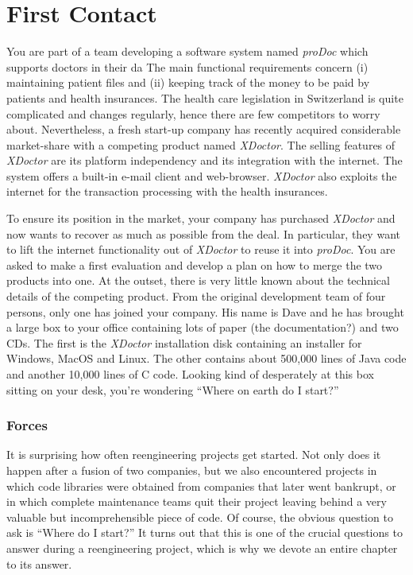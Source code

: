 \documentclass[a4paper,10pt,twoside]{book}
\begin{document}
	\renewcommand{\nnbb}[2]{} %
	\sloppy
\fi
\chapter{First Contact}

You are part of a team developing a software system named \emph{proDoc} which supports doctors in their da	 The main functional requirements concern (i) maintaining patient files and (ii) keeping track of the money to be paid by patients and health insurances. The health care legislation in Switzerland is quite complicated and changes regularly, hence there are few competitors to worry about. Nevertheless, a fresh start-up company has recently acquired considerable market-share with a competing product named \emph{XDoctor}. The selling features of \emph{XDoctor} are its platform independency and its integration with the internet. The system offers a built-in e-mail client and web-browser. \emph{XDoctor} also exploits the internet for the transaction processing with the health insurances.

To ensure its position in the market, your company has purchased \emph{XDoctor} and now wants to recover as much as possible from the deal. In particular, they want to lift the internet functionality out of \emph{XDoctor} to reuse it into \emph{proDoc}. You are asked to make a first evaluation and develop a plan on how to merge the two products into one. At the outset, there is very little known about the technical details of the competing product. From the original development team of four persons, only one has joined your company. His name is Dave and he has brought a large box to your office containing lots of paper (the documentation?) and two CDs. The first is the \emph{XDoctor} installation disk containing an installer for Windows, MacOS and Linux. The other contains about 500,000 lines of Java code and another 10,000 lines of C code. Looking kind of desperately at this box sitting on your desk, you're wondering ``Where on earth do I start?''

\subsection*{Forces}

It is surprising how often reengineering projects get started. Not only does it happen after a fusion of two companies, but we also encountered projects in which code libraries were obtained from companies that later went bankrupt, or in which complete maintenance teams quit their project leaving behind a very valuable but incomprehensible piece of code. Of course, the obvious question to ask is ``Where do I start?'' It turns out that this is one of the crucial questions to answer during a reengineering project, which is why we devote an entire chapter to its answer.
\end{document}
